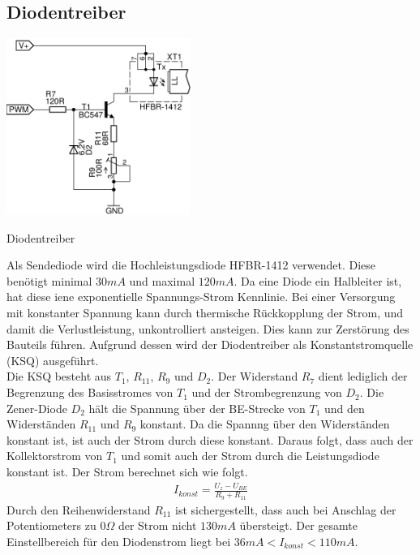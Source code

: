\subsection{Diodentreiber}
\label{sec:ksq}
\noindent
\begin{floatingfigure}[r]{6.5cm}
\includegraphics[width=6cm]{gfx/diodentreiber.pdf}
\caption{Diodentreiber}
\label{fig:diodedriver}
\end{floatingfigure}
\noindent
Als Sendediode wird die Hochleistungsdiode \textsc{HFBR-1412} verwendet. Diese benötigt minimal $30mA$ und maximal $120mA$. Da eine Diode ein Halbleiter ist, hat diese iene exponentielle Span\-nungs-Strom Kennlinie. Bei einer Versorgung mit konstanter Spannung kann durch thermische Rückkopplung der Strom, und damit die Verlustleistung, unkontrolliert ansteigen. Dies kann zur Zer\-störung des Bauteils führen. Aufgrund dessen wird der Diodentreiber als Konstantstromquelle (KSQ) ausgeführt. \\
Die KSQ besteht aus $T_1$, $R_{11}$, $R_9$ und $D_2$. Der Widerstand $R_7$ dient lediglich der Begrenzung des Basisstromes von $T_1$ und der Strombegrenzung von $D_2$.
Die Zener-Diode $D_2$ hält die Spannung über der BE-Strecke von $T_1$ und den Widerständen $R_{11}$ und $R_9$ konstant. Da die Spannng über den Widerständen konstant ist, ist auch der Strom durch diese konstant. Daraus folgt, dass auch der Kollektorstrom von $T_1$ und somit auch der Strom durch die Leistungsdiode konstant ist.
Der Strom berechnet sich wie folgt.
\begin{align}
I_{konst} = \frac{U_z-U_{BE}}{R_9+R_{11}}
\end{align} 
Durch den Reihenwiderstand $R_{11}$	ist sichergestellt, dass auch bei Anschlag der Potentiometers zu $0\Omega$ der Strom nicht $130mA$ übersteigt. Der gesamte Einstellbereich für den Diodenstrom liegt bei $36mA < I_{konst}< 110mA$.
\newpage